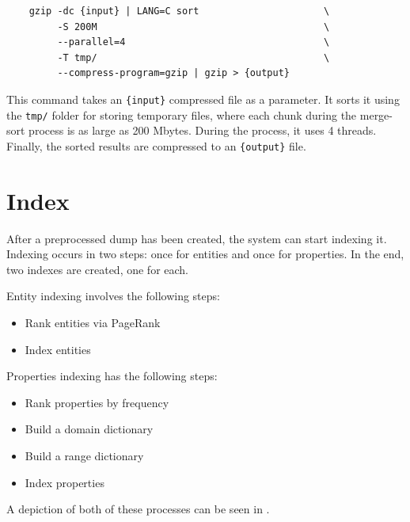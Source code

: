 \begin{verbatim}
    gzip -dc {input} | LANG=C sort                      \
         -S 200M                                        \
         --parallel=4                                   \
         -T tmp/                                        \
         --compress-program=gzip | gzip > {output}
\end{verbatim}

This command takes an \texttt{\{input\}} compressed file as a parameter. It sorts it using the \texttt{tmp/} folder for storing temporary files, where each chunk during the merge-sort process is as large as 200 Mbytes. During the process, it uses 4 threads. Finally, the sorted results are compressed to an \texttt{\{output\}} file.


\section{Index}
\label{chap:index}

After a preprocessed dump has been created, the system can start indexing it. 
Indexing occurs in two steps: once for entities and once for properties. In the end, two indexes are created, one for each.

Entity indexing involves the following steps:
\begin{itemize}
    \item Rank entities via PageRank
    \item Index entities
\end{itemize}

Properties indexing has the following steps:
\begin{itemize}
    \item Rank properties by frequency
    \item Build a domain dictionary
    \item Build a range dictionary
    \item Index properties
\end{itemize}

A depiction of both of these processes can be seen in .

